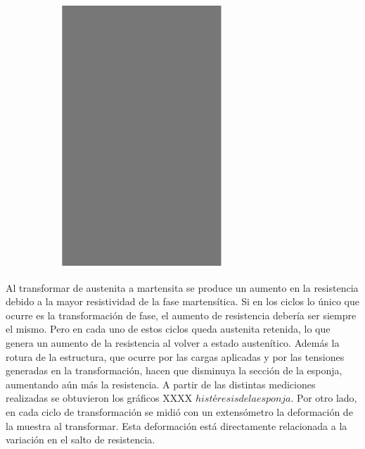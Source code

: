 \documentclass[a4paper,12pt,fleqn,twoside,openany]{book}
\begin{document}
\begin{figure}
\begin{subfigure}{0.2\textwidth}
        \includegraphics[width=\textwidth]{Img/Resultados/Resistencia/EsponjaRM.eps}
        \caption{}%
        \label{fig: EspRM}
    \end{subfigure}    
    \caption{ }
    \label{EstadosEsponja}
    \end{figure}

Al transformar de austenita a martensita se produce un aumento en la resistencia debido a la mayor resistividad de la fase martensítica. Si en los ciclos lo único que ocurre es la transformación de fase, el aumento de resistencia debería ser siempre el mismo. Pero en cada uno de estos ciclos queda austenita retenida, lo que genera un aumento de la resistencia al volver a estado austenítico. Además la rotura de la estructura, que ocurre por las cargas aplicadas y por las tensiones generadas en la transformación, hacen que disminuya la sección de la esponja, aumentando aún más la resistencia. 
A partir de las distintas mediciones realizadas se obtuvieron los gráficos XXXX $histéresis de la esponja$. Por otro lado, en cada ciclo de transformación se midió con un extensómetro la deformación de la muestra al transformar. Esta deformación está directamente relacionada a la variación en el salto de resistencia.
\end{document}

